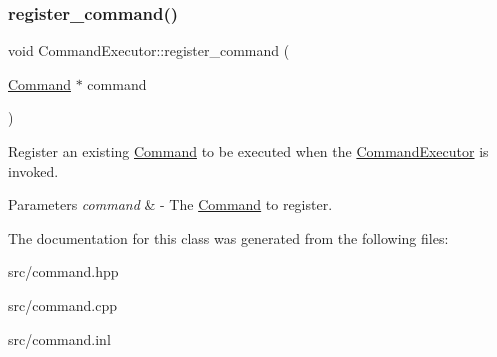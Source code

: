 \subsubsection{\texorpdfstring{register\+\_\+command()}{register\_command()}}
{\footnotesize\ttfamily void Command\+Executor\+::register\+\_\+command (\begin{DoxyParamCaption}\item[{\mbox{\hyperlink{class_command}{Command}} $\ast$}]{command }\end{DoxyParamCaption})}

Register an existing \mbox{\hyperlink{class_command}{Command}} to be executed when the \mbox{\hyperlink{class_command_executor}{Command\+Executor}} is invoked. 
\begin{DoxyParams}{Parameters}
{\em command} & -\/ The \mbox{\hyperlink{class_command}{Command}} to register. \\
\hline
\end{DoxyParams}


The documentation for this class was generated from the following files\+:\begin{DoxyCompactItemize}
\item 
src/command.\+hpp\item 
src/command.\+cpp\item 
src/command.\+inl\end{DoxyCompactItemize}
